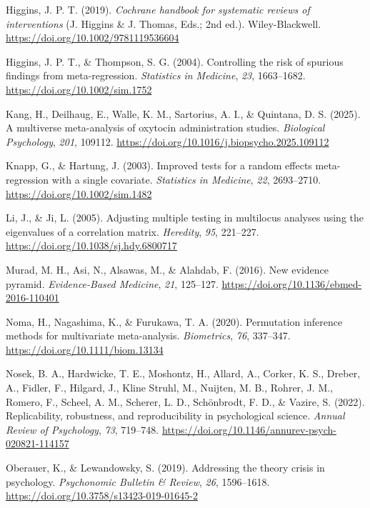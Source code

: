 \documentclass[
  man,
  longtable,
  nolmodern,
  notxfonts,
  notimes,
  colorlinks=true,linkcolor=blue,citecolor=blue,urlcolor=blue]{apa7}
\newlength{\cslhangindent}
\newenvironment{CSLReferences}[2] %
 {\begin{list}{}{%
  \setlength{\itemindent}{0pt}
  \setlength{\leftmargin}{0pt}
  \setlength{\parsep}{0pt}
  \ifodd #1
   \setlength{\leftmargin}{\cslhangindent}
   \setlength{\itemindent}{-1\cslhangindent}
  \fi
  \setlength{\itemsep}{#2\baselineskip}}}
 {\end{list}}
\begin{document}
\begin{CSLReferences}{1}{0}
Higgins, J. P. T. (2019). \emph{{Cochrane handbook for systematic
reviews of interventions}} (J. Higgins \& J. Thomas, Eds.; 2nd ed.).
Wiley-Blackwell. \url{https://doi.org/10.1002/9781119536604}

Higgins, J. P. T., \& Thompson, S. G. (2004). {Controlling the risk of
spurious findings from meta-regression}. \emph{Statistics in Medicine},
\emph{23}, 1663--1682. \url{https://doi.org/10.1002/sim.1752}

Kang, H., Deilhaug, E., Walle, K. M., Sartorius, A. I., \& Quintana, D.
S. (2025). {A multiverse meta-analysis of oxytocin administration
studies}. \emph{Biological Psychology}, \emph{201}, 109112.
\url{https://doi.org/10.1016/j.biopsycho.2025.109112}

Knapp, G., \& Hartung, J. (2003). {Improved tests for a random effects
meta-regression with a single covariate}. \emph{Statistics in Medicine},
\emph{22}, 2693--2710. \url{https://doi.org/10.1002/sim.1482}

Li, J., \& Ji, L. (2005). {Adjusting multiple testing in multilocus
analyses using the eigenvalues of a correlation matrix}.
\emph{Heredity}, \emph{95}, 221--227.
\url{https://doi.org/10.1038/sj.hdy.6800717}

Murad, M. H., Asi, N., Alsawas, M., \& Alahdab, F. (2016). {New evidence
pyramid}. \emph{Evidence-Based Medicine}, \emph{21}, 125--127.
\url{https://doi.org/10.1136/ebmed-2016-110401}

Noma, H., Nagashima, K., \& Furukawa, T. A. (2020). {Permutation
inference methods for multivariate meta-analysis}. \emph{Biometrics},
\emph{76}, 337--347. \url{https://doi.org/10.1111/biom.13134}

Nosek, B. A., Hardwicke, T. E., Moshontz, H., Allard, A., Corker, K. S.,
Dreber, A., Fidler, F., Hilgard, J., Kline Struhl, M., Nuijten, M. B.,
Rohrer, J. M., Romero, F., Scheel, A. M., Scherer, L. D., Schönbrodt, F.
D., \& Vazire, S. (2022). {Replicability, robustness, and
reproducibility in psychological science}. \emph{Annual Review of
Psychology}, \emph{73}, 719--748.
\url{https://doi.org/10.1146/annurev-psych-020821-114157}

Oberauer, K., \& Lewandowsky, S. (2019). {Addressing the theory crisis
in psychology}. \emph{Psychonomic Bulletin \& Review}, \emph{26},
1596--1618. \url{https://doi.org/10.3758/s13423-019-01645-2}


\end{CSLReferences}
\end{document}
